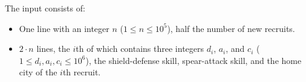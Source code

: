 
    The input consists of:
    \begin{itemize}
        \item One line with an integer $n$ ($1\leq n \leq 10^5$), half the number of new recruits.
        \item $2 \cdot n$ lines, the $i$th of which contains three integers $d_i$, $a_i$, and $c_i$ ($1 \leq d_i, a_i, c_i \leq 10^6$), the shield-defense skill, spear-attack skill, and the home city of the $i$th recruit.
    \end{itemize}
